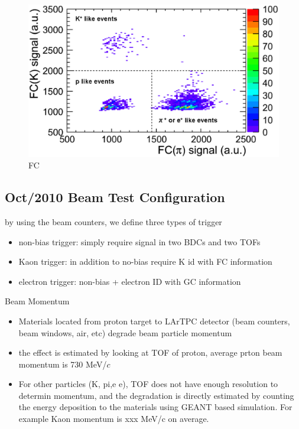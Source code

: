 \begin{figure}[htbp]
  \begin{center}
    \includegraphics[width=1.0\hsize,clip]{fig/FC_KPI.eps}
  \end{center}
 \caption{FC}
 \label{fig:BeamCountersFC}
\end{figure}

\subsection{Oct/2010 Beam Test Configuration}

by using the beam counters, we define three types of trigger
\begin{itemize}
\item non-bias trigger:  simply require signal in two BDCs and two TOFs
\item Kaon trigger:  in addition to no-bias require K id with FC information  
\item electron trigger: non-bias + electron ID with GC information
\end{itemize}

Beam Momentum
\begin{itemize}
\item Materials located from proton target to LArTPC detector (beam counters, beam windows, air, etc) degrade beam particle momentum
\item the effect is estimated by looking at TOF of proton, average prton beam momentum is 730 MeV/$c$
\item For other particles  (K, pi,e e), TOF does not have enough resolution to determin momentum, and the degradation
is directly estimated by counting the energy deposition to the materials using GEANT based simulation.
For example Kaon momentum is xxx MeV/c on average.
\end{itemize}

